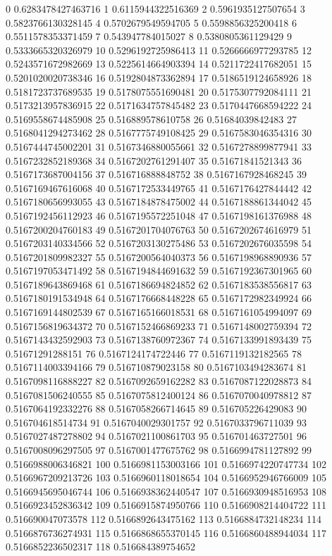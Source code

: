 0 0.6283478427463716
1 0.6115944322516369
2 0.5961935127507654
3 0.5823766130328145
4 0.5702679549594705
5 0.5598856325200418
6 0.5511578353371459
7 0.543947784015027
8 0.5380805361129429
9 0.5333665320326979
10 0.5296192725986413
11 0.5266666977293785
12 0.5243571672982669
13 0.5225614664903394
14 0.5211722417682051
15 0.5201020020738346
16 0.5192804873362894
17 0.5186519124658926
18 0.5181723737689535
19 0.5178075551690481
20 0.5175307792084111
21 0.5173213957836915
22 0.5171634757845482
23 0.5170447668594222
24 0.5169558674485908
25 0.516889578610758
26 0.51684039842483
27 0.5168041294273462
28 0.5167775749108425
29 0.5167583046354316
30 0.5167444745002201
31 0.5167346880055661
32 0.5167278899877941
33 0.5167232852189368
34 0.5167202761291407
35 0.51671841521343
36 0.5167173687004156
37 0.516716888848752
38 0.5167167928468245
39 0.5167169467616068
40 0.5167172533449765
41 0.5167176427844442
42 0.5167180656993055
43 0.5167184878475002
44 0.5167188861344042
45 0.5167192456112923
46 0.5167195572251048
47 0.5167198161376988
48 0.5167200204760183
49 0.5167201704076763
50 0.5167202674616979
51 0.5167203140334566
52 0.5167203130275486
53 0.5167202676035598
54 0.5167201809982327
55 0.5167200564040373
56 0.5167198968890936
57 0.5167197053471492
58 0.5167194844691632
59 0.5167192367301965
60 0.5167189643869468
61 0.5167186694824852
62 0.5167183538556817
63 0.5167180191534948
64 0.5167176668448228
65 0.5167172982349924
66 0.5167169144802539
67 0.5167165166018531
68 0.5167161054994097
69 0.5167156819634372
70 0.5167152466869233
71 0.5167148002759394
72 0.5167143432592903
73 0.5167138760972367
74 0.5167133991893439
75 0.51671291288151
76 0.5167124174722446
77 0.5167119132182565
78 0.5167114003394166
79 0.516710879023158
80 0.5167103494283674
81 0.5167098116888227
82 0.5167092659162282
83 0.5167087122028873
84 0.5167081506240555
85 0.5167075812400124
86 0.5167070040978812
87 0.5167064192332276
88 0.5167058266714645
89 0.516705226429083
90 0.516704618514734
91 0.5167040029301757
92 0.5167033796711039
93 0.5167027487278802
94 0.5167021100861703
95 0.516701463727501
96 0.5167008096297505
97 0.5167001477675762
98 0.5166994781127892
99 0.5166988006346821
100 0.5166981153003166
101 0.5166974220747734
102 0.5166967209213726
103 0.5166960118018654
104 0.5166952946766009
105 0.5166945695046744
106 0.5166938362440547
107 0.5166930948516953
108 0.5166923452836342
109 0.5166915874950766
110 0.5166908214404722
111 0.516690047073578
112 0.5166892643475162
113 0.5166884732148234
114 0.5166876736274931
115 0.5166868655370145
116 0.5166860488944034
117 0.5166852236502317
118 0.516684389754652
